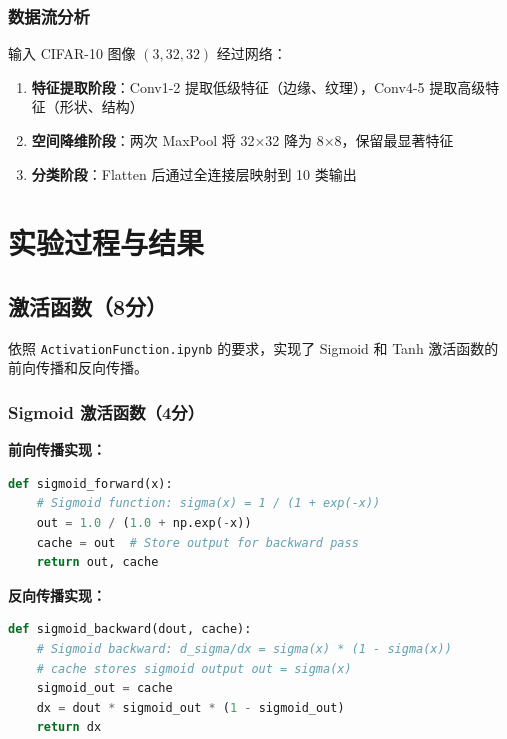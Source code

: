 \documentclass[a4paper]{article}
\begin{document}
\subsubsection{数据流分析}

输入 CIFAR-10 图像 $(3, 32, 32)$ 经过网络：
\begin{enumerate}
    \item \textbf{特征提取阶段}：Conv1-2 提取低级特征（边缘、纹理），Conv4-5 提取高级特征（形状、结构）
    \item \textbf{空间降维阶段}：两次 MaxPool 将 32×32 降为 8×8，保留最显著特征
    \item \textbf{分类阶段}：Flatten 后通过全连接层映射到 10 类输出
\end{enumerate}

\section{实验过程与结果}

\subsection{激活函数（8分）}

依照 \texttt{ActivationFunction.ipynb} 的要求，实现了 Sigmoid 和 Tanh 激活函数的前向传播和反向传播。

\subsubsection{Sigmoid 激活函数（4分）}

\textbf{前向传播实现：}

\begin{lstlisting}[language=Python]
def sigmoid_forward(x):
    # Sigmoid function: sigma(x) = 1 / (1 + exp(-x))
    out = 1.0 / (1.0 + np.exp(-x))
    cache = out  # Store output for backward pass
    return out, cache
\end{lstlisting}

\textbf{反向传播实现：}

\begin{lstlisting}[language=Python]
def sigmoid_backward(dout, cache):
    # Sigmoid backward: d_sigma/dx = sigma(x) * (1 - sigma(x))
    # cache stores sigmoid output out = sigma(x)
    sigmoid_out = cache
    dx = dout * sigmoid_out * (1 - sigmoid_out)
    return dx
\end{lstlisting}
\end{document}
